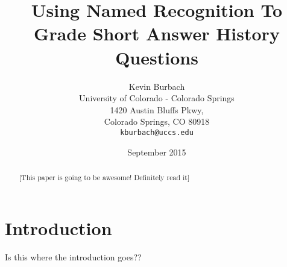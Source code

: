 \documentclass{sig-alternate}
\begin{document}
\title{Using Named Recognition To Grade Short Answer History Questions}
\author{Kevin Burbach\\
        University of Colorado - Colorado Springs\\
        1420 Austin Bluffs Pkwy,\\
        Colorado Springs, CO 80918\\
        \texttt{kburbach@uccs.edu}
       }
\date{September 2015}

\maketitle

\begin{abstract}
   [This paper is going to be awesome! Definitely read it]
\end{abstract}


\section{Introduction}
Is this where the introduction goes??








{}

\end{document}
